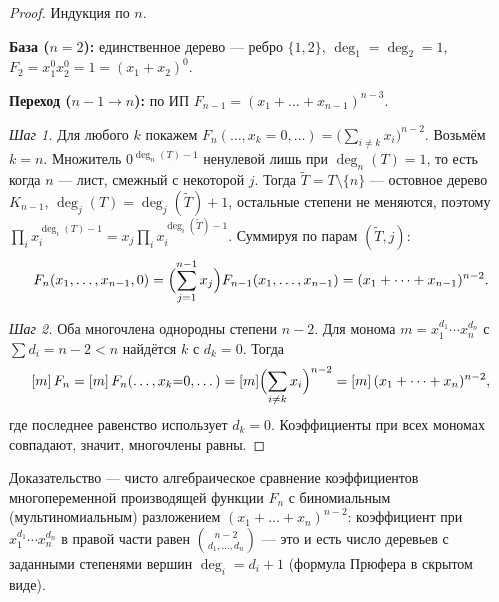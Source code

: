 \begin{proof}
	Индукция по $n$.

	\textbf{База ($n=2$):} единственное дерево — ребро $\{1,2\}$, $\deg_1=\deg_2=1$, $F_2=x_1^0x_2^0=1=(x_1+x_2)^0$.

	\textbf{Переход ($n-1\to n$):} по ИП $F_{n-1}=(x_1+\dots+x_{n-1})^{n-3}$.

	\emph{Шаг 1.} Для любого $k$ покажем $F_n(\dots,x_k{=}0,\dots)=\bigl(\sum_{i\neq k}x_i\bigr)^{n-2}$. Возьмём $k=n$. Множитель $0^{\deg_n(T)-1}$ ненулевой лишь при $\deg_n(T)=1$, то есть когда $n$ — лист, смежный с некоторой $j$. Тогда $\tilde T=T\setminus\{n\}$ — остовное дерево $K_{n-1}$, $\deg_j(T)=\deg_j(\tilde T)+1$, остальные степени не меняются, поэтому $\prod_i x_i^{\deg_i(T)-1}=x_j\prod_i x_i^{\deg_i(\tilde T)-1}$. Суммируя по парам $(\tilde T,j)$:
	\[
	F_n(x_1,\dots,x_{n-1},0)=\Bigl(\sum_{j=1}^{n-1}x_j\Bigr)F_{n-1}(x_1,\dots,x_{n-1})=(x_1+\dots+x_{n-1})^{n-2}.
	\]

	\emph{Шаг 2.} Оба многочлена однородны степени $n-2$. Для монома $m=x_1^{d_1}\cdots x_n^{d_n}$ с $\sum d_i=n-2<n$ найдётся $k$ с $d_k=0$. Тогда
	\[
	[m]\,F_n=[m]\,F_n(\dots,x_k{=}0,\dots)=[m]\Bigl(\sum_{i\neq k}x_i\Bigr)^{n-2}=[m]\,(x_1+\dots+x_n)^{n-2},
	\]
	где последнее равенство использует $d_k=0$. Коэффициенты при всех мономах совпадают, значит, многочлены равны.
\end{proof}

\begin{Remark}{}{}
	Доказательство — чисто алгебраическое сравнение коэффициентов многопеременной производящей функции $F_n$ с биномиальным (мультиномиальным) разложением $(x_1+\dots+x_n)^{n-2}$: коэффициент при $x_1^{d_1}\cdots x_n^{d_n}$ в правой части равен $\binom{n-2}{d_1,\dots,d_n}$ — это и есть число деревьев с заданными степенями вершин $\deg_i=d_i+1$ (формула Прюфера в скрытом виде).
\end{Remark}
